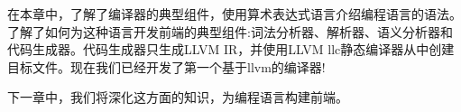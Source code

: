 在本章中，了解了编译器的典型组件，使用算术表达式语言介绍编程语言的语法。了解了如何为这种语言开发前端的典型组件:词法分析器、解析器、语义分析器和代码生成器。代码生成器只生成LLVM IR，并使用LLVM llc静态编译器从中创建目标文件。现在我们已经开发了第一个基于llvm的编译器!

下一章中，我们将深化这方面的知识，为编程语言构建前端。
